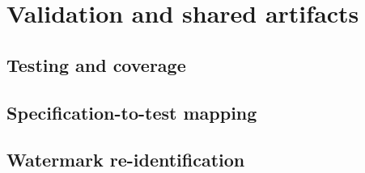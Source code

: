 \section{Validation and shared artifacts}
\subsection{Testing and coverage}
\subsection{Specification-to-test mapping}
\subsection{Watermark re-identification}
